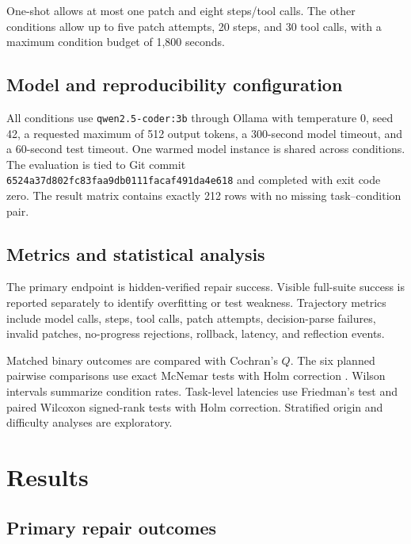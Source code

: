 \documentclass[11pt,a4paper]{article}
\newcommand{\code}[1]{\texttt{#1}}
\begin{document}
One-shot allows at most one patch and eight steps/tool calls. The other conditions
allow up to five patch attempts, 20 steps, and 30 tool calls, with a maximum
condition budget of 1,800 seconds.

\subsection{Model and reproducibility configuration}

All conditions use \code{qwen2.5-coder:3b} through Ollama with temperature 0,
seed 42, a requested maximum of 512 output tokens, a 300-second model timeout,
and a 60-second test timeout. One warmed model instance is shared across
conditions. The evaluation is tied to Git commit
\code{6524a37d802fc83faa9db0111facaf491da4e618} and completed with exit code
zero. The result matrix contains exactly 212 rows with no missing
task--condition pair.

\subsection{Metrics and statistical analysis}

The primary endpoint is hidden-verified repair success. Visible full-suite
success is reported separately to identify overfitting or test weakness.
Trajectory metrics include model calls, steps, tool calls, patch attempts,
decision-parse failures, invalid patches, no-progress rejections, rollback,
latency, and reflection events.

Matched binary outcomes are compared with Cochran's $Q$. The six planned
pairwise comparisons use exact McNemar tests with Holm correction
\cite{mcnemar,holm}. Wilson intervals summarize condition rates. Task-level
latencies use Friedman's test and paired Wilcoxon signed-rank tests with Holm
correction. Stratified origin and difficulty analyses are exploratory.

\clearpage
\section{Results}

\subsection{Primary repair outcomes}
\end{document}
